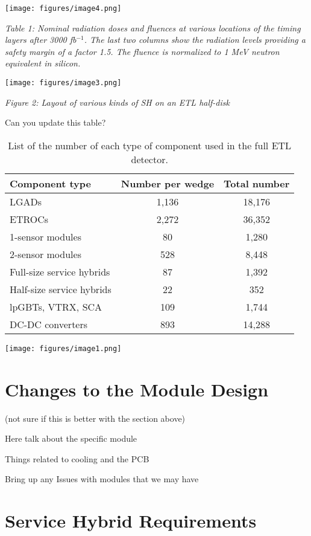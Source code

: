 \documentclass[11pt]{article}
\begin{document}
\texttt{[image: figures/image4.png]}

\emph{Table 1: Nominal radiation doses and fluences at various locations of the timing layers after 3000 fb$^{-1}$. The last two columns show the radiation levels providing a safety margin of a factor 1.5. The fluence is normalized to 1 MeV neutron equivalent in silicon.}

\texttt{[image: figures/image3.png]}

\emph{Figure 2: Layout of various kinds of SH on an ETL half-disk}

Can you update this table?

\begin{table}
\caption{List of the number of each type of component used in the full ETL detector.}
\centering
\begin{tabular}{|l c c|}
\hline
Component type & Number per wedge & Total number \\
\hline
 LGADs & 1,136 & 18,176\\
 ETROCs & 2,272 & 36,352\\
 1-sensor modules & 80 & 1,280\\
 2-sensor modules & 528 & 8,448\\
 Full-size service hybrids & 87 & 1,392\\
 Half-size service hybrids & 22 & 352\\
 lpGBTs, VTRX, SCA & 109 & 1,744\\
 DC-DC converters & 893 & 14,288\\ %
\hline
\end{tabular}
\label{tab:ETLNumberOfComponents}
\end{table}

\texttt{[image: figures/image1.png]}

\section{Changes to the Module Design}

(not sure if this is better with the section above)

Here talk about the specific module

Things related to cooling and the PCB

Bring up any Issues with modules that we may have

\section{Service Hybrid Requirements}
\end{document}
